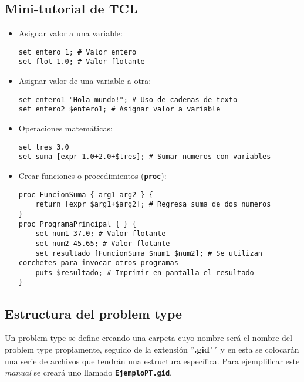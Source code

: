 \documentclass[10pt, a4paper, twocolumn]{article} %
\begin{document}
\subsection{Mini-tutorial de TCL}

\lstset{language=tcl} 

\begin{itemize}
\item Asignar valor a una variable:
\begin{lstlisting}
set entero 1; # Valor entero
set flot 1.0; # Valor flotante 
\end{lstlisting}

\item Asignar valor de una variable a otra:
\begin{lstlisting}
set entero1 "Hola mundo!"; # Uso de cadenas de texto
set entero2 $entero1; # Asignar valor a variable
\end{lstlisting}

\item Operaciones matemáticas:
\begin{lstlisting}
set tres 3.0
set suma [expr 1.0+2.0+$tres]; # Sumar numeros con variables
\end{lstlisting}

\item Crear funciones o procedimientos (\textbf{\texttt{proc}}):
\begin{lstlisting}
proc FuncionSuma { arg1 arg2 } {
	return [expr $arg1+$arg2]; # Regresa suma de dos numeros
}
proc ProgramaPrincipal { } {
	set num1 37.0; # Valor flotante 
	set num2 45.65; # Valor flotante 
	set resultado [FuncionSuma $num1 $num2]; # Se utilizan corchetes para invocar otros programas
	puts $resultado; # Imprimir en pantalla el resultado
}

\end{lstlisting}

\end{itemize}

\subsection{Estructura del problem type}

Un problem type se define creando una carpeta cuyo nombre será el nombre del problem type propiamente, seguido de la extensión ''\textbf{.gid}´´ y en esta se colocarán una serie de archivos que tendrán una estructura específica. Para ejemplificar este \textit{manual} se creará uno llamado \textbf{\texttt{EjemploPT.gid}}.
\end{document}

